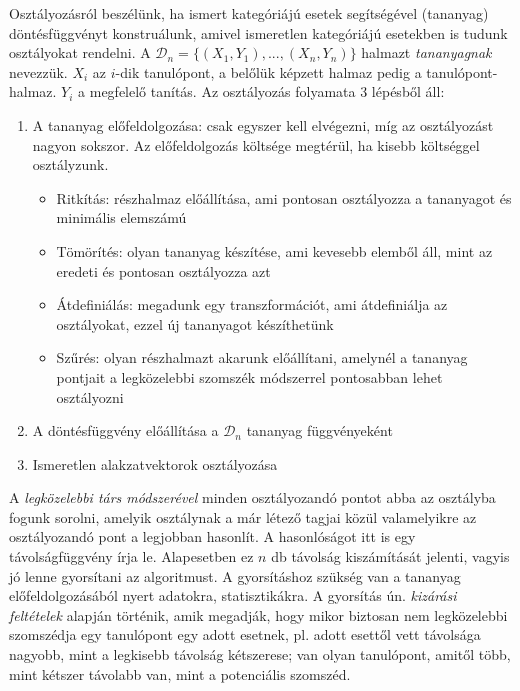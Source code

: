 Osztályozásról beszélünk, ha ismert kategóriájú esetek segítségével (tananyag) döntésfüggvényt konstruálunk, amivel ismeretlen kategóriájú esetekben is tudunk osztályokat rendelni. A $\mathcal{D}_n = \{ (X_1,Y_1), ..., (X_n,Y_n)\}$ halmazt \emph{tananyagnak} nevezzük. $X_i$ az $i$-dik tanulópont, a belőlük képzett halmaz pedig a tanulópont-halmaz. $Y_i$ a megfelelő tanítás. Az osztályozás folyamata 3 lépésből áll:
\begin{enumerate}
\item A tananyag előfeldolgozása: csak egyszer kell elvégezni, míg az osztályozást nagyon sokszor. Az előfeldolgozás költsége megtérül, ha kisebb költséggel osztályzunk.
\begin{itemize}
\item Ritkítás: részhalmaz előállítása, ami pontosan osztályozza a tananyagot és minimális elemszámú
\item Tömörítés: olyan tananyag készítése, ami kevesebb elemből áll, mint az eredeti és pontosan osztályozza azt
\item Átdefiniálás: megadunk egy transzformációt, ami átdefiniálja az osztályokat, ezzel új tananyagot készíthetünk
\item Szűrés: olyan részhalmazt akarunk előállítani, amelynél a tananyag pontjait a legközelebbi szomszék módszerrel pontosabban lehet osztályozni
\end{itemize}
\item A döntésfüggvény előállítása a $\mathcal{D}_n$ tananyag függvényeként
\item Ismeretlen alakzatvektorok osztályozása
\end{enumerate}

A \emph{legközelebbi társ módszerével} minden osztályozandó pontot abba az osztályba fogunk sorolni, amelyik osztálynak a már létező tagjai közül valamelyikre az osztályozandó pont a legjobban hasonlít. A hasonlóságot itt is egy távolságfüggvény írja le. Alapesetben ez $n$ db távolság kiszámítását jelenti, vagyis jó lenne gyorsítani az algoritmust. A gyorsításhoz szükség van a tananyag előfeldolgozásából nyert adatokra, statisztikákra. A gyorsítás ún. \emph{kizárási feltételek} alapján történik, amik megadják, hogy mikor biztosan nem legközelebbi szomszédja egy tanulópont egy adott esetnek, pl. adott esettől vett távolsága nagyobb, mint a legkisebb távolság kétszerese; van olyan tanulópont, amitől több, mint kétszer távolabb van, mint a potenciális szomszéd.
